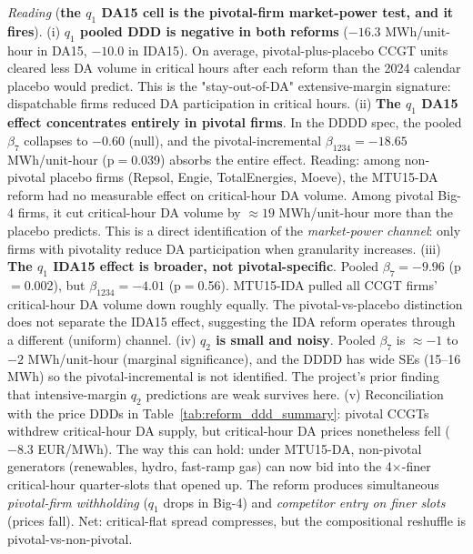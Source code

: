 \documentclass[11pt,a4paper]{article}
\begin{document}
\textit{Reading} (\textbf{the $q_1$ DA15 cell is the pivotal-firm market-power test, and it fires}).
(i) \textbf{$q_1$ pooled DDD is negative in both reforms} ($-16.3$ MWh/unit-hour in DA15, $-10.0$ in IDA15). On average, pivotal-plus-placebo CCGT units cleared less DA volume in critical hours after each reform than the 2024 calendar placebo would predict. This is the "stay-out-of-DA" extensive-margin signature: dispatchable firms reduced DA participation in critical hours.
(ii) \textbf{The $q_1$ DA15 effect concentrates entirely in pivotal firms}. In the DDDD spec, the pooled $\beta_7$ collapses to $-0.60$ (null), and the pivotal-incremental $\beta_{1234} = -18.65$ MWh/unit-hour (p$=$0.039) absorbs the entire effect. Reading: among non-pivotal placebo firms (Repsol, Engie, TotalEnergies, Moeve), the MTU15-DA reform had no measurable effect on critical-hour DA volume. Among pivotal Big-4 firms, it cut critical-hour DA volume by $\approx 19$ MWh/unit-hour more than the placebo predicts. This is a direct identification of the \emph{market-power channel}: only firms with pivotality reduce DA participation when granularity increases.
(iii) \textbf{The $q_1$ IDA15 effect is broader, not pivotal-specific}. Pooled $\beta_7 = -9.96$ (p$=$0.002), but $\beta_{1234} = -4.01$ (p$=$0.56). MTU15-IDA pulled all CCGT firms' critical-hour DA volume down roughly equally. The pivotal-vs-placebo distinction does not separate the IDA15 effect, suggesting the IDA reform operates through a different (uniform) channel.
(iv) \textbf{$q_2$ is small and noisy}. Pooled $\beta_7$ is $\approx -1$ to $-2$ MWh/unit-hour (marginal significance), and the DDDD has wide SEs (15--16 MWh) so the pivotal-incremental is not identified. The project's prior finding that intensive-margin $q_2$ predictions are weak survives here.
(v) Reconciliation with the price DDDs in Table~\ref{tab:reform_ddd_summary}: pivotal CCGTs withdrew critical-hour DA supply, but critical-hour DA prices nonetheless fell ($-8.3$ EUR/MWh). The way this can hold: under MTU15-DA, non-pivotal generators (renewables, hydro, fast-ramp gas) can now bid into the 4$\times$-finer critical-hour quarter-slots that opened up. The reform produces simultaneous \emph{pivotal-firm withholding} ($q_1$ drops in Big-4) and \emph{competitor entry on finer slots} (prices fall). Net: critical-flat spread compresses, but the compositional reshuffle is pivotal-vs-non-pivotal.
\end{document}
